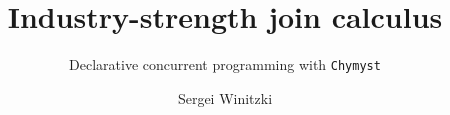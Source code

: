 \documentclass[sigplan,10pt]{acmart}\settopmatter{}
\begin{document}
\title[Industry-strength join calculus]{Industry-strength join calculus}         %
\subtitle{Declarative concurrent programming with \texttt{Chymyst}}                     %



\author{Sergei Winitzki}


\end{document}

